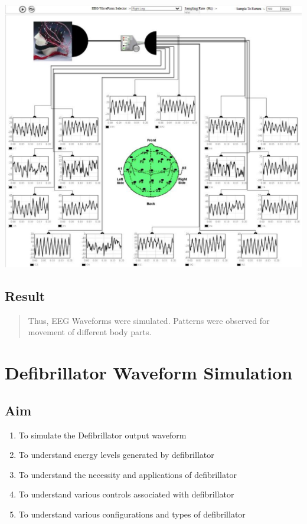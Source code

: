 \documentclass[
  11pt,
  letterpaper,
  DIV=11,
  numbers=noendperiod]{scrreprt}
\providecommand{\tightlist}{%
  \setlength{\itemsep}{0pt}\setlength{\parskip}{0pt}}\usepackage{longtable,booktabs,array}
\begin{document}
\begin{center}
\includegraphics[width=5.70833in,height=\textheight]{images/clipboard-1649723628.png}
\end{center}

\section{Result}\label{result-5}

\begin{quote}
Thus, EEG Waveforms were simulated. Patterns were observed for movement
of different body parts.
\end{quote}


\chapter{Defibrillator Waveform
Simulation}\label{defibrillator-waveform-simulation}

\section{Aim}\label{aim-7}

\begin{enumerate}
\def\labelenumi{\arabic{enumi}.}
\tightlist
\item
  To simulate the Defibrillator output waveform
\item
  To understand energy levels generated by defibrillator
\item
  To understand the necessity and applications of defibrillator
\item
  To understand various controls associated with defibrillator
\item
  To understand various configurations and types of defibrillator
\end{enumerate}
\end{document}
